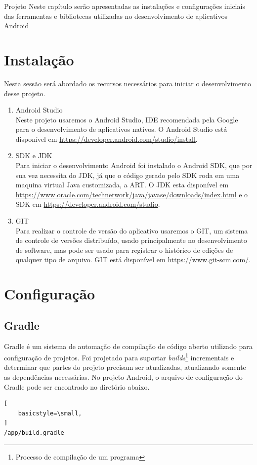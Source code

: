 \documentclass[
	12pt,				%
	openright,			%
	twoside,			%
	a4paper,			%
	english,			%
	french,				%
	spanish,			%
	brazil				%
	]{abntex2}
\begin{document}
\begin{chapter}{Projeto}
Neste capítulo serão apresentadas as instalações e configurações iniciais das ferramentas e bibliotecas utilizadas no desenvolvimento de aplicativos Android
\section{Instalação}
Nesta sessão será abordado os  recursos necessários para iniciar o desenvolvimento desse projeto.
\begin{enumerate}
  \item{Android Studio} \\
  Neste projeto usaremos o Android Studio, IDE recomendada pela Google para o desenvolvimento de aplicativos nativos. O Android Studio está disponível em \url{https://developer.android.com/studio/install}.
  \item{SDK e JDK} \\ Para iniciar o desenvolvimento Android foi instalado o Android SDK, que por sua vez necessita do JDK, já que o código gerado pelo SDK roda em uma maquina virtual Java customizada, a ART.
  O JDK esta disponível em \url{https://www.oracle.com/technetwork/java/javase/downloads/index.html} e o SDK em \url{https://developer.android.com/studio}.
  \item{GIT} \\
  Para realizar o controle de versão do aplicativo usaremos o GIT, um sistema de controle de versões distribuído, usado principalmente no desenvolvimento de software, mas pode ser usado para registrar o histórico de edições de qualquer tipo de arquivo. 
  GIT está disponível em \url{https://www.git-scm.com/}.
  
\end{enumerate}



\section{Configuração}
\subsection{Gradle}
Gradle é um sistema de automação de compilação de código aberto utilizado para configuração de projetos. Foi projetado para suportar \textit{builds}\footnote{Processo de compilação de um programa} incrementais e determinar que partes do projeto precisam ser atualizadas, atualizando somente as dependências necessárias.
No projeto Android, o arquivo de configuração do Gradle pode ser encontrado no diretório abaixo. \begin{lstlisting}[
    basicstyle=\small,
]
/app/build.gradle
\end{lstlisting}

\end{chapter}
\end{document}
